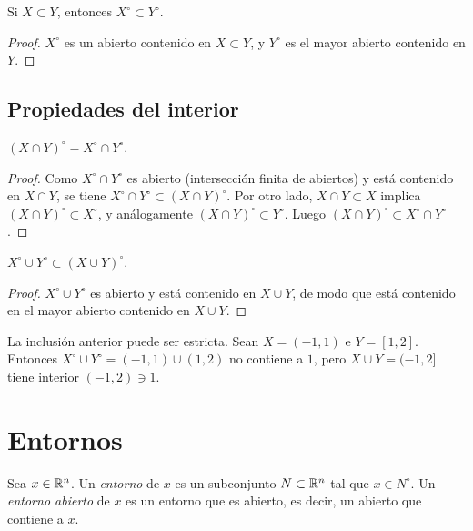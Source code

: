 \begin{corollary}
  Si \(X \subset Y\), entonces \(X^{\circ} \subset Y^{\circ}\).
\end{corollary}

\begin{proof}
  \(X^{\circ}\) es un abierto contenido en \(X \subset Y\), y \(Y^{\circ}\) es el mayor abierto contenido en \(Y\).
\end{proof}

\subsection*{Propiedades del interior}

\begin{prop}
  \({(X \cap Y)}^{\circ} = X^{\circ} \cap Y^{\circ}\).
\end{prop}

\begin{proof}
  Como \(X^{\circ} \cap Y^{\circ}\) es abierto (intersección finita de abiertos) y está contenido en \(X \cap Y\), se tiene \(X^{\circ} \cap Y^{\circ} \subset {(X \cap Y)}^{\circ}\). Por otro lado, \(X \cap Y \subset X\) implica \({(X \cap Y)}^{\circ} \subset X^{\circ}\), y análogamente \({(X \cap Y)}^{\circ} \subset Y^{\circ}\). Luego \({(X \cap Y)}^{\circ} \subset X^{\circ} \cap Y^{\circ}\).
\end{proof}

\begin{prop}
  \(X^{\circ} \cup Y^{\circ} \subset {(X \cup Y)}^{\circ}\).
\end{prop}

\begin{proof}
  \(X^{\circ} \cup Y^{\circ}\) es abierto y está contenido en \(X \cup Y\), de modo que está contenido en el mayor abierto contenido en \(X \cup Y\).
\end{proof}

\begin{eg}
  La inclusión anterior puede ser estricta. Sean \(X = (-1, 1)\) e \(Y = [1, 2]\). Entonces \(X^{\circ} \cup Y^{\circ} = (-1, 1) \cup (1, 2)\) no contiene a \(1\), pero \(X \cup Y = (-1, 2]\) tiene interior \((-1, 2) \ni 1\).
\end{eg}

\section{Entornos}

\begin{definition}[Entorno]
  Sea \(x \in \mathbb{R}^n\). Un \emph{entorno} de \(x\) es un subconjunto \(N \subset \mathbb{R}^n\) tal que \(x \in N^{\circ}\). Un \emph{entorno abierto} de \(x\) es un entorno que es abierto, es decir, un abierto que contiene a \(x\).
\end{definition}

